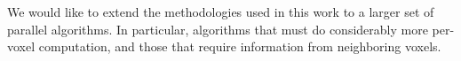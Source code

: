 We would like to extend the methodologies used in this work to a larger
set of parallel algorithms.  In particular, algorithms that must
do considerably more per-voxel computation, and those that require
information from neighboring voxels.

%
%
%
%
%
%
%
%
%
%

